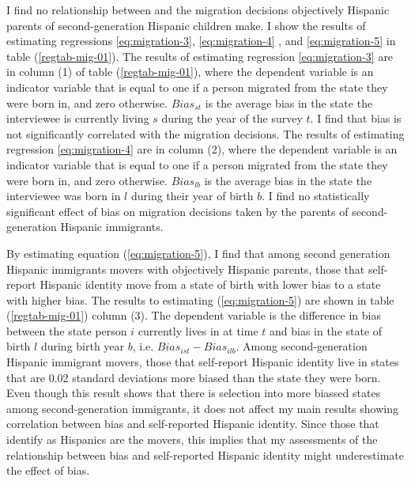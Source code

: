 \documentclass[12pt, fullpage]{article}
\begin{document}
I find no relationship between and the migration decisions objectively Hispanic parents of second-generation Hispanic children make. I show the results of estimating regressions  \ref{eq:migration-3},  \ref{eq:migration-4} , and \ref{eq:migration-5} in table (\ref{regtab-mig-01}). The results of estimating regression \ref{eq:migration-3} are in column (1) of table (\ref{regtab-mig-01}), where the dependent variable is an indicator variable that is equal to one if a person migrated from the state they were born in, and zero otherwise. $Bias_{st}$ is the average bias in the state the interviewee is currently living $s$ during the year of the survey $t$. I find that bias is not significantly correlated with the migration decisions. The results of estimating regression \ref{eq:migration-4} are in column (2), where the dependent variable is an indicator variable that is equal to one if a person migrated from the state they were born in, and zero otherwise. $Bias_{lb}$ is the average bias in the state the interviewee was born in $l$ during their year of birth $b$. I find no statistically significant effect of bias on migration decisions taken by the parents of second-generation Hispanic immigrants.

By estimating equation (\ref{eq:migration-5}), I find that among second generation Hispanic immigrants movers with objectively Hispanic parents, those that self-report Hispanic identity move from a state of birth with lower bias to a state with higher bias. The results to estimating (\ref{eq:migration-5}) are shown in table (\ref{regtab-mig-01}) column (3). The dependent variable is the difference in bias between the state person $i$ currently lives in at time $t$ and bias in the state of birth $l$ during birth year $b$, i.e. $Bias_{ist} - Bias_{ilb}$. Among second-generation Hispanic immigrant movers, those that self-report Hispanic identity live in states that are 0.02 standard deviations more biased than the state they were born. Even though this result shows that there is selection into more biassed states among second-generation immigrants, it does not affect my main results showing correlation between bias and self-reported Hispanic identity. Since those that identify as Hispanics are the movers, this implies that my assessments of the relationship between bias and self-reported Hispanic identity might underestimate the effect of bias. 


\end{document}
